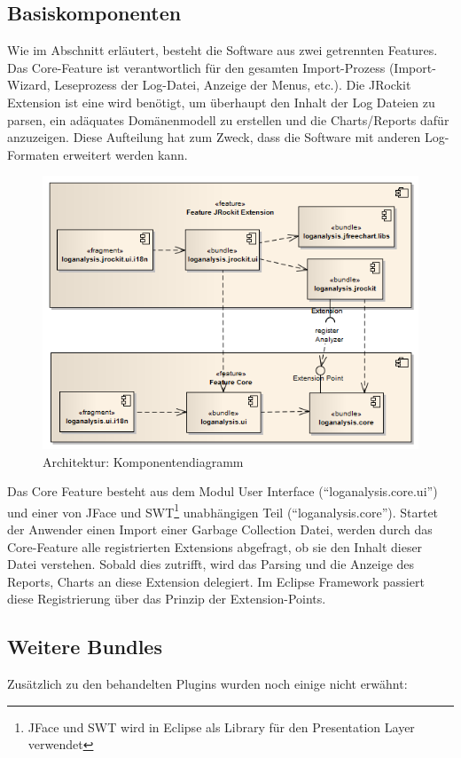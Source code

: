 \subsection{Basiskomponenten}
Wie im Abschnitt  erläutert, besteht die Software aus zwei getrennten Features. Das Core-Feature ist verantwortlich für den gesamten Import-Prozess (Import-Wizard, Leseprozess der Log-Datei, Anzeige der Menus, etc.). Die JRockit Extension ist eine wird benötigt, um überhaupt den Inhalt der Log Dateien zu parsen, ein adäquates Domänenmodell zu erstellen und die Charts/Reports dafür anzuzeigen. Diese Aufteilung hat zum Zweck, dass die Software mit anderen Log-Formaten erweitert werden kann.
 \begin{figure}[H]
  	\centering
        	\caption{Architektur: Komponentendiagramm}
    	\includegraphics[width=15cm]{images/architektur_komponenten_uebersicht}
\end{figure}

Das Core Feature besteht aus dem Modul User Interface (``loganalysis.core.ui'') und einer von JFace und SWT\footnote{JFace und SWT wird in Eclipse als Library für den Presentation Layer verwendet} unabhängigen Teil (``loganalysis.core''). Startet der Anwender einen Import einer Garbage Collection Datei, werden durch das Core-Feature alle registrierten Extensions abgefragt, ob sie den Inhalt dieser Datei verstehen. Sobald dies zutrifft, wird das Parsing und die Anzeige des Reports, Charts an diese Extension delegiert. Im Eclipse Framework passiert diese Registrierung über das Prinzip der Extension-Points.

\subsection{Weitere Bundles}
Zusätzlich zu den behandelten Plugins wurden noch einige nicht erwähnt:

